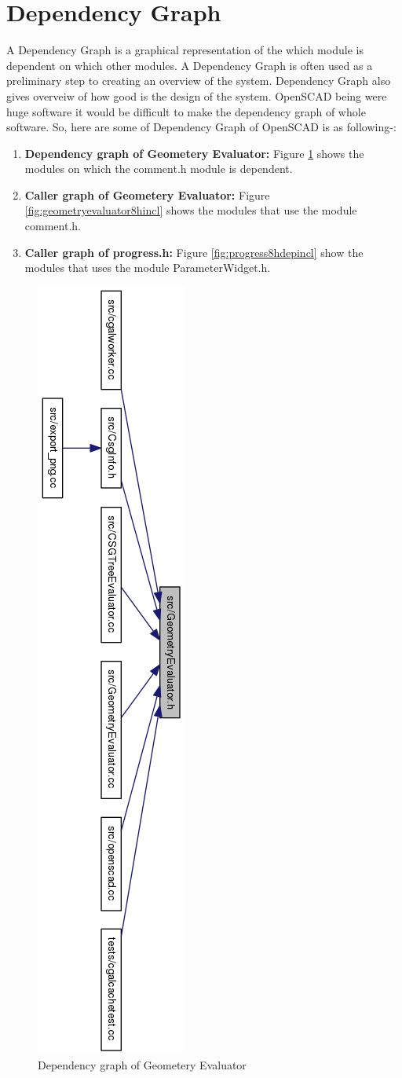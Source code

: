 \section{Dependency Graph}
A Dependency Graph is a graphical representation of the which module is dependent on which other modules. A Dependency Graph is often used as a preliminary step to creating an overview of the system. Dependency Graph also gives overveiw of how good is the design of the system.
OpenSCAD being were huge software it would be difficult to make the dependency graph of whole software. So, here are some of Dependency Graph of OpenSCAD is as following-:
\begin{enumerate}
	\item \textbf{Dependency graph of Geometery Evaluator:} Figure \ref{fig:geometryevaluator8hdepincl} shows the modules on which the comment.h module is dependent.
	\item \textbf{Caller graph of Geometery Evaluator:} Figure \ref{fig:geometryevaluator8hincl} shows the modules that use the module comment.h.
	\item \textbf{Caller graph of progress.h:} Figure \ref{fig:progress8hdepincl} show the modules that uses the module ParameterWidget.h.
\end{enumerate}

\begin{figure}[H]
	\centering
	\includegraphics[height=1.37\columnwidth]{images/GeometryEvaluator_8h__dep__incl}
	\caption{Dependency graph of Geometery Evaluator}
	\label{fig:geometryevaluator8hdepincl}
\end{figure}

